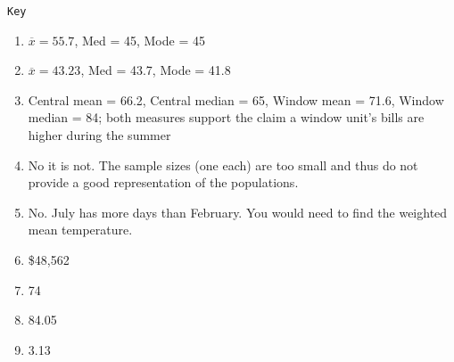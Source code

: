 \documentclass{article}
\begin{document}
\newpage 

\texttt{Key}

\begin{enumerate}
    \item $\overline{x} = 55.7$, Med = 45, Mode = 45
    \item $\overline{x} = 43.23$, Med = 43.7, Mode = 41.8
    \item Central mean = 66.2, Central median = 65, Window mean = 71.6, Window median = 84; both measures support the claim a window unit's bills are higher during the summer
    \item No it is not. The sample sizes (one each) are too small and thus do not provide a good representation of the populations.
    \item No. July has more days than February. You would need to find the weighted mean temperature.
    \item \$48,562
    \item 74
    \item 84.05
    \item 3.13
\end{enumerate}
\end{document}
